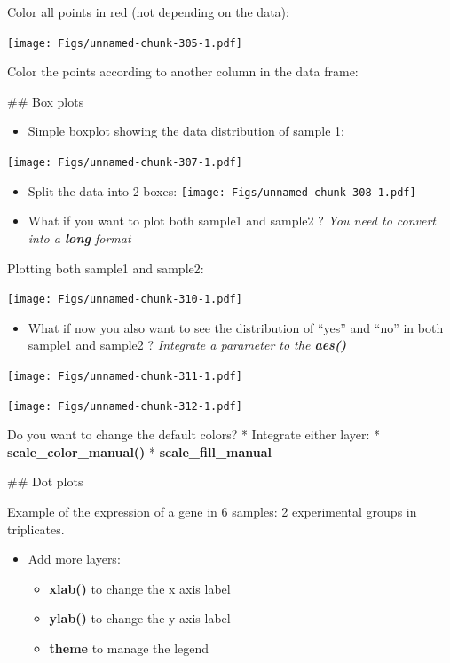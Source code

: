 \documentclass[]{book}
\providecommand{\tightlist}{%
  \setlength{\itemsep}{0pt}\setlength{\parskip}{0pt}}
\begin{document}
Color all points in red (not depending on the data):

\texttt{[image: Figs/unnamed-chunk-305-1.pdf]}

Color the points according to another column in the data frame:

\#\# Box plots

\begin{itemize}
\tightlist
\item
  Simple boxplot showing the data distribution of sample 1:
\end{itemize}

\texttt{[image: Figs/unnamed-chunk-307-1.pdf]}

\begin{itemize}
\item
  Split the data into 2 boxes:
  \texttt{[image: Figs/unnamed-chunk-308-1.pdf]}
\item
  What if you want to plot both sample1 and sample2 ?
  \emph{You need to convert into a \textbf{long} format}
\end{itemize}

Plotting both sample1 and sample2:

\texttt{[image: Figs/unnamed-chunk-310-1.pdf]}

\begin{itemize}
\tightlist
\item
  What if now you also want to see the distribution of ``yes'' and ``no'' in both sample1 and sample2 ?
  \emph{Integrate a parameter to the \textbf{aes()}}
\end{itemize}

\texttt{[image: Figs/unnamed-chunk-311-1.pdf]}

\texttt{[image: Figs/unnamed-chunk-312-1.pdf]}

Do you want to change the default colors?
* Integrate either layer:
* \textbf{scale\_color\_manual()}
* \textbf{scale\_fill\_manual}

\#\# Dot plots

Example of the expression of a gene in 6 samples: 2 experimental groups in triplicates.

\begin{itemize}
\tightlist
\item
  Add more layers:

  \begin{itemize}
  \tightlist
  \item
    \textbf{xlab()} to change the x axis label
  \item
    \textbf{ylab()} to change the y axis label
  \item
    \textbf{theme} to manage the legend
  \end{itemize}
\end{itemize}
\end{document}
